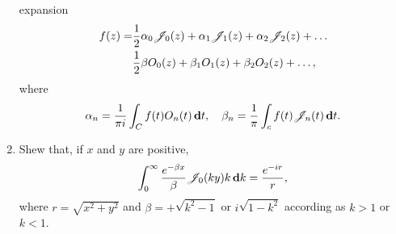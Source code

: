 \documentclass{book}
\begin{document}
\begin{enumerate}
  expansion
  \begin{align*}
    f(z)
    =&
    \frac{1}{2} \alpha_{0} \mathscr{J}_{0}(z) + \alpha_{1} \mathscr{J}_{1}(z)
    + \alpha_{2} \mathscr{J}_{2}(z) + \dots
    \\
    &
    \frac{1}{2} \beta O_{0}(z) + \beta_{1} O_{1}(z) + \beta_{2} O_{2}(z) + \dots,
  \end{align*}
  where
  $$
  \alpha_{n}
  =
  \frac{1}{\pi i}
  \int_{C} f(t) O_{n}(t) \, \mathbf{d} t,
  \quad
  \beta_{n}
  =
  \frac{1}{\pi}
  \int_{c} f(t) \mathscr{J}_{n}(t) \, \mathbf{d} t.
  $$
\item
  Shew that, if $x$ and $y$ are positive,
  $$
  \int_{0}^{\infty}
  \frac{e^{-\beta x}}{\beta}
  \mathscr{J}_{0}(ky)
  k \, \mathbf{d} k
  =
  \frac{e^{-ir}}{r},
  $$
  where $r = \sqrt{x^{2}+y^{2}}$ and
  $\beta = +\sqrt{k^{2} - 1}$
  or
  $i \sqrt{1 - k^{2}}$
  according as $k>1$ or $k<1$.
\end{enumerate}
\end{document}
